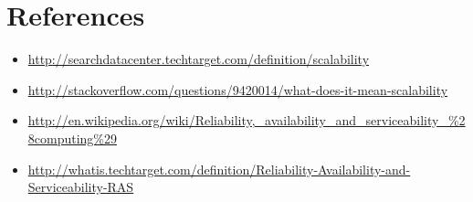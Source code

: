 \documentclass[12pt]{article}
\begin{document}
\section{References}
\begin{itemize}
\item \url{http://searchdatacenter.techtarget.com/definition/scalability }
\item \url{http://stackoverflow.com/questions/9420014/what-does-it-mean-scalability}
\item \url{http://en.wikipedia.org/wiki/Reliability,_availability_and_serviceability_%28computing%29}
\item \url{http://whatis.techtarget.com/definition/Reliability-Availability-and-Serviceability-RAS}
\end{itemize}
\end{document}
